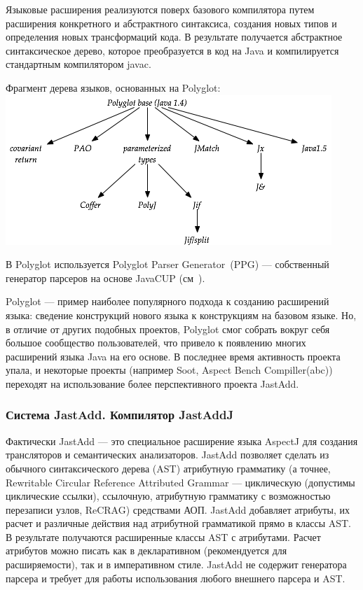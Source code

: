 \documentclass[a4paper,12pt,titlepage]{extarticle}
\begin{document}
Языковые расширения реализуются поверх базового компилятора путем расширения
конкретного и абстрактного синтаксиса, создания новых типов и
определения новых трансформаций кода. В результате получается абстрактное синтаксическое дерево,
которое преобразуется в код на Java и компилируется стандартным
компилятором javac.

\begin{center}
Фрагмент дерева языков, основанных на Polyglot:
\nopagebreak
 \includegraphics[scale=0.6]{img/polyglot-tree.png}
\end{center}

В Polyglot используется Polyglot Parser Generator~(PPG) --- собственный генератор
парсеров на основе JavaCUP (см~\cite{javacup}).

Polyglot --- пример наиболее популярного подхода к созданию расширений языка:
сведение конструкций нового языка к конструкциям на базовом языке. Но, в
отличие от других подобных проектов, Polyglot смог собрать вокруг себя большое
сообщество пользователей, что привело к появлению многих расширений языка Java
на его основе. В последнее время активность проекта упала, и некоторые проекты
(например Soot, Aspect Bench Compiller(abc)) переходят на использование более
перспективного проекта JastAdd.

\subsubsection*{Система JastAdd. Компилятор JastAddJ}
\label{jastadd}
Фактически JastAdd --- это специальное расширение языка AspectJ для создания
трансляторов и семантических анализаторов. JastAdd позволяет сделать из
обычного синтаксического дерева (AST) атрибутную грамматику (а точнее, 
Rewritable Circular Reference Attributed Grammar --- циклическую (допустимы
циклические ссылки), ссылочную, атрибутную грамматику с возможностью
перезаписи узлов, ReCRAG) средствами АОП. JastAdd добавляет атрибуты, их расчет
и различные действия над атрибутной грамматикой прямо в классы AST. В
результате получаются расширенные классы AST с атрибутами. Расчет атрибутов
можно писать как в декларативном (рекомендуется для расширяемости), так и в
императивном стиле. JastAdd не содержит генератора парсера и требует
для работы использования любого внешнего парсера и AST.
\end{document}
